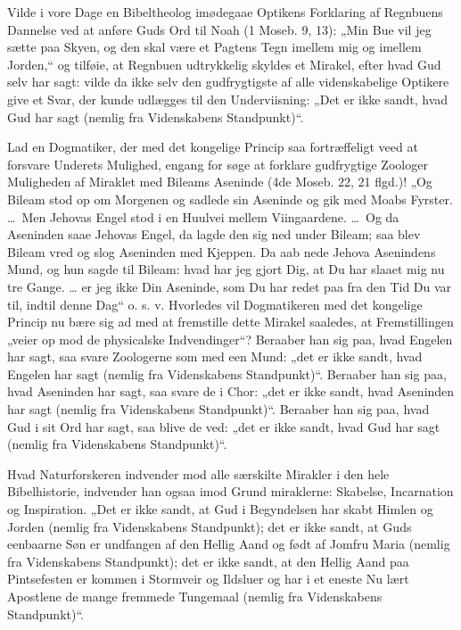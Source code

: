 \documentclass[12pt]{book}
\newcommand{\opage}[1]{\marginnote{\footnotesize\textit{[#1]}}}
\begin{document}
Vilde i vore Dage en Bibeltheolog imødegaae Optikens
Forklaring af Regnbuens Dannelse ved at anføre Guds
Ord til Noah (1 Moseb. 9, 13): „Min Bue vil jeg sætte
paa Skyen, og den skal være et Pagtens Tegn imellem mig
og imellem Jorden,“ og tilføie, at Regnbuen udtrykkelig
skyldes et Mirakel, efter hvad Gud selv har sagt: vilde da
ikke selv den gudfrygtigste af alle videnskabelige Optikere give
et Svar, der kunde udlægges til den Underviisning: „Det
er ikke sandt, hvad Gud har sagt (nemlig fra Videnskabens
Standpunkt)“.

Lad en Dogmatiker, der med det kongelige Princip saa
fortræffeligt veed at forsvare Underets Mulighed, engang for\-%
søge at forklare gudfrygtige Zoologer Muligheden af Miraklet
med Bileams Aseninde (4de Moseb. 22, 21 flgd.)! „Og
Bileam stod op om Morgenen og sadlede sin Aseninde og
gik med Moabs Fyrster. \dots\ Men Jehovas Engel stod i
en Huulvei mellem Viingaardene. \dots\ Og da Aseninden saae
Jehovas Engel, da lagde den sig ned under Bileam; saa
blev Bileam vred og slog Aseninden med Kjeppen. Da aab\-%
nede Jehova Asenindens Mund, og hun sagde til Bileam:
\opage{27}\setcounter{footnote}{0}%
hvad har jeg gjort Dig, at Du har slaaet mig nu tre Gange.
\dots{} er jeg ikke Din Aseninde, som Du har redet paa fra den
Tid Du var til, indtil denne Dag“ o. s. v. Hvorledes vil
Dogmatikeren med det kongelige Princip nu bære sig ad
med at fremstille dette Mirakel saaledes, at Fremstillingen
„veier op mod de physicalske Indvendinger“? Beraaber han
sig paa, hvad Engelen har sagt, saa svare Zoologerne som
med een Mund: „det er ikke sandt, hvad Engelen har sagt
(nemlig fra Videnskabens Standpunkt)“. Beraaber han sig
paa, hvad Aseninden har sagt, saa svare de i Chor: „det er
ikke sandt, hvad Aseninden har sagt (nemlig fra Videnskabens
Standpunkt)“. Beraaber han sig paa, hvad Gud i sit Ord
har sagt, saa blive de ved: „det er ikke sandt, hvad Gud har
sagt (nemlig fra Videnskabens Standpunkt)“. %

Hvad Naturforskeren indvender mod alle særskilte Mirakler
i den hele Bibelhistorie, indvender han ogsaa imod Grund\-%
miraklerne: Skabelse, Incarnation og Inspiration. „Det
er ikke sandt, at Gud i Begyndelsen har skabt Himlen og
Jorden (nemlig fra Videnskabens Standpunkt); det er ikke
sandt, at Guds eenbaarne Søn er undfangen af den Hellig
Aand og født af Jomfru Maria (nemlig fra Videnskabens
Standpunkt); det er ikke sandt, at den Hellig Aand paa
Pintsefesten er kommen i Stormveir og Ildsluer og har i et
eneste Nu lært Apostlene de mange fremmede Tungemaal
(nemlig fra Videnskabens Standpunkt)“.
\end{document}
